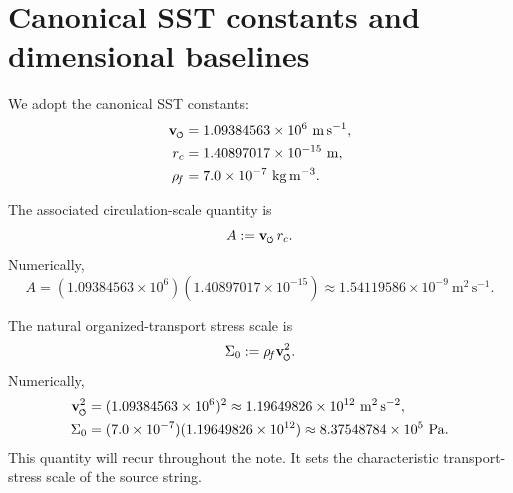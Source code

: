 \documentclass[11pt]{article}
\newcommand{\swirlarrow}{\mathchoice{\mkern-2mu\scriptstyle\boldsymbol{\circlearrowleft}}{\mkern-2mu\scriptstyle\boldsymbol{\circlearrowleft}}{\mkern-2mu\scriptscriptstyle\boldsymbol{\circlearrowleft}}{\mkern-2mu\scriptscriptstyle\boldsymbol{\circlearrowleft}}}
\newcommand{\vswirl}{\mathbf{v}_{\swirlarrow}}
\newcommand{\rhoF}{\rho_{\!f}}
\newcommand{\rc}{{r_c}}
\begin{document}
        \section{Canonical SST constants and dimensional baselines}
            
            We adopt the canonical SST constants:
            \begin{align}
                \vswirl &= 1.09384563\times 10^6\ \mathrm{m\,s^{-1}},
                \label{eq:const-vswirl}
                \\
                \rc &= 1.40897017\times 10^{-15}\ \mathrm{m},
                \label{eq:const-rc}
                \\
                \rhoF &= 7.0\times 10^{-7}\ \mathrm{kg\,m^{-3}}.
                \label{eq:const-rhof}
            \end{align}
            
            The associated circulation-scale quantity is
            \begin{equation}
                A := \vswirl\,\rc.
                \label{eq:def-A}
            \end{equation}
            Numerically,
            \begin{equation}
                A
                =
                (1.09384563\times 10^6)(1.40897017\times 10^{-15})
                \approx
                1.54119586\times 10^{-9}\ \mathrm{m^2\,s^{-1}}.
                \label{eq:A-numeric}
            \end{equation}
            
            The natural organized-transport stress scale is
            \begin{equation}
                \Sigma_0 := \rhoF \vswirl^2.
                \label{eq:def-Sigma0}
            \end{equation}
            Numerically,
            \begin{align}
                \vswirl^2
                &=
                (1.09384563\times 10^6)^2
                \approx
                1.19649826\times 10^{12}\ \mathrm{m^2\,s^{-2}},
                \\
                \Sigma_0
                &=
                (7.0\times 10^{-7})(1.19649826\times 10^{12})
                \approx
                8.37548784\times 10^5\ \mathrm{Pa}.
                \label{eq:Sigma0-numeric}
            \end{align}
            This quantity will recur throughout the note. It sets the characteristic transport-stress scale of the source string.
        
\end{document}
